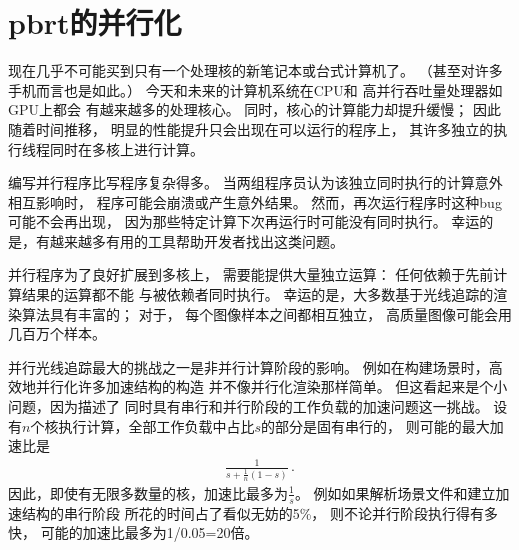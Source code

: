 \section{pbrt的并行化}\label{sec:pbrt的并行化}

现在几乎不可能买到只有一个处理核的新笔记本或台式计算机了。
（甚至对许多手机而言也是如此。）
今天和未来的计算机系统在CPU和
高并行吞吐量处理器如GPU上都会
有越来越多的处理核心。
同时，核心的计算能力却提升缓慢；
因此随着时间推移，
明显的性能提升只会出现在可以运行的程序上，
其许多独立的执行线程同时在多核上进行计算。

编写并行程序比写程序复杂得多。
当两组程序员认为该独立同时执行的计算意外相互影响时，
程序可能会崩溃或产生意外结果。
然而，再次运行程序时这种bug可能不会再出现，
因为那些特定计算下次再运行时可能没有同时执行。
幸运的是，有越来越多有用的工具帮助开发者找出这类问题。

并行程序为了良好扩展到多核上，
需要能提供大量独立运算：
任何依赖于先前计算结果的运算都不能
与被依赖者同时执行。
幸运的是，大多数基于光线追踪的渲染算法具有丰富的；
对于，
每个图像样本之间都相互独立，
高质量图像可能会用几百万个样本。

并行光线追踪最大的挑战之一是非并行计算阶段的影响。
例如在构建场景时，高效地并行化许多加速结构的构造
并不像并行化渲染那样简单。
但这看起来是个小问题，因为描述了
同时具有串行和并行阶段的工作负载的加速问题这一挑战。
设有$n$个核执行计算，全部工作负载中占比$s$的部分是固有串行的，
则可能的最大加速比是
\begin{align*}
    \frac{1}{\displaystyle s+\frac{1}{n}(1-s)}\, .
\end{align*}
因此，即使有无限多数量的核，加速比最多为$\displaystyle\frac{1}{s}$。
例如如果解析场景文件和建立加速结构的串行阶段
所花的时间占了看似无妨的5\%，
则不论并行阶段执行得有多快，
可能的加速比最多为1/0.05=20倍。